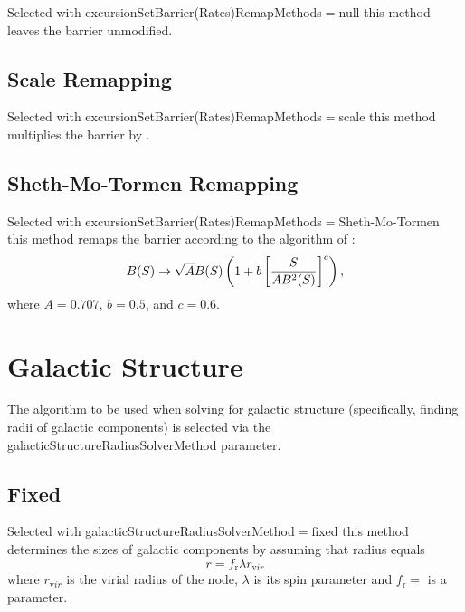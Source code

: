 Selected with {\normalfont \ttfamily excursionSetBarrier(Rates)RemapMethods}$=${\normalfont \ttfamily null} this method leaves the barrier unmodified.

\subsection{Scale Remapping}

Selected with {\normalfont \ttfamily excursionSetBarrier(Rates)RemapMethods}$=${\normalfont \ttfamily scale} this method multiplies the barrier by {\normalfont \ttfamily [excursionSetBarrierRemapScalingFactor]}.

\subsection{Sheth-Mo-Tormen Remapping}

Selected with {\normalfont \ttfamily excursionSetBarrier(Rates)RemapMethods}$=${\normalfont \ttfamily Sheth-Mo-Tormen} this method remaps the barrier according to the algorithm of \cite{sheth_ellipsoidal_2001}:
\begin{equation}
 B(S) \rightarrow \sqrt{A} B(S) \left(1 + b \left[ {S \over A B^2(S)}\right]^c\right),
\end{equation}
where $A=0.707$, $b=0.5$, and $c=0.6$.

\section{Galactic Structure}

The algorithm to be used when solving for galactic structure (specifically, finding radii of galactic components) is selected via the {\normalfont \ttfamily galacticStructureRadiusSolverMethod} parameter.

\subsection{Fixed}

Selected with {\normalfont \ttfamily galacticStructureRadiusSolverMethod}$=${\normalfont \ttfamily fixed} this method determines the sizes of galactic components by assuming that radius equals
\begin{equation}
 r = f_{\mathrm r} \lambda r_{\mathrm vir}
\end{equation}
where $r_{\mathrm vir}$ is the virial radius of the \gls{node}, $\lambda$ is its spin parameter and $f_{\mathrm r}=${\normalfont \ttfamily [galacticStructureRadiiFixedFactor]} is a parameter.

